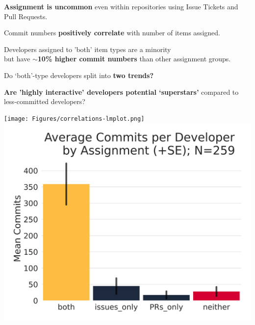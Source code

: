 \documentclass[25pt, a0paper, landscape, margin=10mm, innermargin=15mm, blockverticalspace=10mm, subcolspace=7mm, dvipsnames]{tikzposter} %
\begin{document}
\begin{columns}
{\begin{multicols}{2}
    {\fontsize{30}{30}\selectfont 
    \textbf{Assignment is uncommon} even within repositories using Issue Tickets and Pull Requests. \par \newline
    \vspace{0.5em}
    Commit numbers \textbf{positively correlate} with number of items assigned. \par \newline
    \vspace{0.5em}
    Developers assigned to 'both' item types are a minority \\ but have \textbf{$\sim$10\% higher commit numbers} than other assignment groups. \par \newline
    \vspace{0.5em}
    Do `both'-type developers split into \textbf{two trends?} \par
    \begin{tcolorbox}[colframe=white,colback=epccnavy!25, linewidth=0.8*linewidth]{\textbf{Are 'highly interactive' developers potential `superstars'} compared to less-committed developers?
    \par}
    \end{tcolorbox}
    }
         \begin{tikzfigure}[]
            \texttt{[image: Figures/correlations-lmplot.png]}
            \vspace{0.2em}
            \includegraphics[width=0.80\linewidth]{Figures/bars-mean-commits.png}
        \end{tikzfigure}
    \end{multicols}
}
\end{columns}
\end{document}
